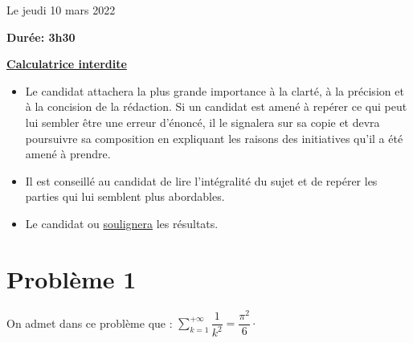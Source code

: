 \documentclass[twoside,french,11pt]{VcCours}
\begin{document}

\begin{center}
\large 
Le jeudi 10 mars 2022

\bigskip
\textbf{Durée: 3h30}

\bigskip
\large\underline{\textbf{Calculatrice interdite}}
\end{center}

\bigskip
\begin{itemize}
  \item Le candidat attachera la plus grande importance à la clarté, à la précision et à la concision de la rédaction. Si un candidat est amené à repérer ce qui peut lui sembler être une erreur d'énoncé, il le signalera sur sa copie et devra poursuivre sa composition en expliquant les raisons des initiatives qu'il a été amené à prendre.
  \item Il est conseillé au candidat de lire l'intégralité du sujet et de repérer les parties qui lui semblent plus abordables.
  \item Le candidat  ou \underline{soulignera} les résultats.
  \end{itemize}
\separationTitre

\section*{Problème 1}

On admet dans ce problème que : $\sum_{k=1}^{+ \infty} \dfrac{1}{k^2} = \dfrac{\pi^2}{6} \cdot$
\end{document}
